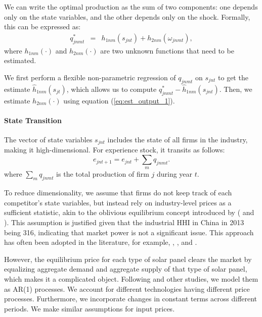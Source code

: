 \documentclass[12pt]{article}
\begin{document}
We can write the optimal production as the sum of two components: one depends only on the state variables, and the other depends only on the shock. Formally, this can be expressed as:
\begin{eqnarray}
q_{jnmt}^* &=& h_{1nm}(s_{jnt})+h_{2nm}(\omega_{jnmt}),\label{eq:est_output_2}
\end{eqnarray}
where $h_{1nm}(\cdot)$ and $h_{2nm}(\cdot)$ are two unknown functions that need to be estimated.

We first perform a flexible non-parametric regression of $q_{jnmt}$ on $s_{jnt}$ to get the estimate $\hat{h}_{1nm}(s_{jt})$, which allows us to compute $q^*_{jnmt}-\hat{h}_{1nm}(s_{jnt})$. Then, we estimate $h_{2nm}(\cdot)$ using equation (\ref{eq:est_output_1}).

\paragraph{State Transition}
The vector of state variables $s_{jnt}$ includes the state of all firms in the industry, making it high-dimensional. %
For experience stock, it transits as follows:
\[
e_{jnt+1}  =  e_{jnt} + \sum_m q_{jnmt}.
\]
where $\sum_m q_{jnmt}$ is the total production of firm $j$ during year $t$.

To reduce dimensionality, we assume that firms do not keep track of each competitor's state variables, but instead rely on industry-level prices as a sufficient statistic, akin to the oblivious equilibrium concept introduced by (\citet{weintraub2008markov} and \citet{benkard2015oblivious}). This assumption is justified given that the industrial HHI in China in 2013 being 316, indicating that market power is not a significant issue. This approach has often been adopted in the literature, for example, \citet{jeon2022learning}, \citet{chen2023structural}, and \citet{barwick2025industrial}.

However, the equilibrium price for each type of solar panel clears the market by equalizing aggregate demand and aggregate supply of that type of solar panel, which makes it a complicated object. Following \citet{barwick2025industrial} and other studies, we model them as AR(1) processes. We account for different technologies having different price processes. Furthermore, we incorporate changes in constant terms across different periods. We make similar assumptions for input prices. 
\end{document}
